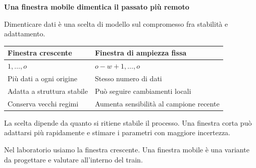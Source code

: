 \documentclass[12pt,aspectratio=1610]{beamer}
\newcommand{\PBody}[1]{\par{\fontsize{11.3}{14.8}\selectfont #1\par}}
\newcommand{\PSmall}[1]{\par{\fontsize{9.8}{13.1}\selectfont #1\par}}
\newcommand{\PInfo}[1]{%
\begin{tcolorbox}[enhanced,arc=1.6mm,boxrule=.55pt,colback=GeoTint,
 colframe=Rule!80!Classical,left=2.3mm,right=2.3mm,top=2mm,bottom=2mm,
 before skip=1mm,after skip=1mm]
\PSmall{#1}\end{tcolorbox}}
\begin{document}
\begin{frame}[plain]\hypertarget{slide72}{}
\begin{lrbox}{\TitleBox}
\begin{minipage}[t]{17.7cm}\raggedright\color{Ink}\fontsize{11.3}{14.8}\selectfont
\color{Navy}\bfseries\fontsize{20.6}{24.5}\selectfont Una finestra mobile dimentica il passato più remoto
\end{minipage}\end{lrbox}

\begin{lrbox}{\RecallBox}
\begin{minipage}[t]{14.3cm}\raggedright\color{Ink}\fontsize{11.3}{14.8}\selectfont
\fontsize{10.3}{13.8}\selectfont Dimenticare dati è una scelta di modello sul compromesso fra stabilità e adattamento.
\end{minipage}\end{lrbox}

\begin{lrbox}{\PilotLeftBox}
\begin{minipage}[t]{10.05cm}\raggedright\color{Ink}\fontsize{11.3}{14.8}\selectfont
{\fontsize{10.2}{13.1}\selectfont\renewcommand{\arraystretch}{1.45}\begin{tabular}{@{}p{4.6cm}p{4.5cm}@{}}\toprule
\textbf{Finestra crescente} & \textbf{Finestra di ampiezza fissa}\\\midrule
$1,\ldots,o$ & $o-w+1,\ldots,o$\\
Più dati a ogni origine & Stesso numero di dati\\
Adatta a struttura stabile & Può seguire cambiamenti locali\\
Conserva vecchi regimi & Aumenta sensibilità al campione recente\\
\bottomrule\end{tabular}}

\end{minipage}\end{lrbox}

\begin{lrbox}{\PilotRightBox}
\begin{minipage}[t]{7.55cm}\raggedright\color{Ink}\fontsize{11.3}{14.8}\selectfont
\PBody{La scelta dipende da quanto si ritiene stabile il processo. Una finestra corta può adattarsi più rapidamente e stimare i parametri con maggiore incertezza.}
\vspace{2.5mm}
\PInfo{Nel laboratorio usiamo la finestra crescente. Una finestra mobile è una variante da progettare e valutare all’interno del train.}


\end{minipage}
\end{lrbox}
\end{frame}
\end{document}
